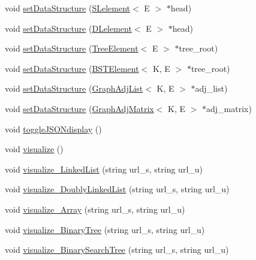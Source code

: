 \begin{DoxyCompactItemize}
\item 
void \hyperlink{classbridges_1_1_bridges_ae5469b9d6cfe0ea2b79c0a082224072d}{set\+Data\+Structure} (\hyperlink{classbridges_1_1_s_lelement}{S\+Lelement}$<$ E $>$ $\ast$head)
\item 
void \hyperlink{classbridges_1_1_bridges_aab453e6347519f7c338b20ca12854146}{set\+Data\+Structure} (\hyperlink{classbridges_1_1_d_lelement}{D\+Lelement}$<$ E $>$ $\ast$head)
\item 
void \hyperlink{classbridges_1_1_bridges_adbc1a98e06e9602996cca175788a2258}{set\+Data\+Structure} (\hyperlink{classbridges_1_1_tree_element}{Tree\+Element}$<$ E $>$ $\ast$tree\+\_\+root)
\item 
void \hyperlink{classbridges_1_1_bridges_aea7aa06709b68551b987ef34e2b403cd}{set\+Data\+Structure} (\hyperlink{classbridges_1_1_b_s_t_element}{B\+S\+T\+Element}$<$ K, E $>$ $\ast$tree\+\_\+root)
\item 
void \hyperlink{classbridges_1_1_bridges_a39f0776e216ffde52583acbfc2dbab0a}{set\+Data\+Structure} (\hyperlink{classbridges_1_1_graph_adj_list}{Graph\+Adj\+List}$<$ K, E $>$ $\ast$adj\+\_\+list)
\item 
void \hyperlink{classbridges_1_1_bridges_a36884a4131a9f8a8905d52d60a6aba39}{set\+Data\+Structure} (\hyperlink{classbridges_1_1_graph_adj_matrix}{Graph\+Adj\+Matrix}$<$ K, E $>$ $\ast$adj\+\_\+matrix)
\item 
void \hyperlink{classbridges_1_1_bridges_ab55b2aa997a62425924084a2fa58a4c3}{toggle\+J\+S\+O\+Ndisplay} ()
\item 
void \hyperlink{classbridges_1_1_bridges_a9dc056c51e3eadff68d637badb0bc3d9}{visualize} ()
\item 
void \hyperlink{classbridges_1_1_bridges_a0b738591d7dec3b2244221e3575d85a4}{visualize\+\_\+\+Linked\+List} (string url\+\_\+s, string url\+\_\+u)
\item 
void \hyperlink{classbridges_1_1_bridges_affa6855df24db3e6a8c27478a7cfd742}{visualize\+\_\+\+Doubly\+Linked\+List} (string url\+\_\+s, string url\+\_\+u)
\item 
void \hyperlink{classbridges_1_1_bridges_ad21f19a4a5de24000109e325048ff4f9}{visualize\+\_\+\+Array} (string url\+\_\+s, string url\+\_\+u)
\item 
void \hyperlink{classbridges_1_1_bridges_aa98a691888869417c6811761f587652d}{visualize\+\_\+\+Binary\+Tree} (string url\+\_\+s, string url\+\_\+u)
\item 
void \hyperlink{classbridges_1_1_bridges_a71d5888a1da6a54991a3ba469d0b6328}{visualize\+\_\+\+Binary\+Search\+Tree} (string url\+\_\+s, string url\+\_\+u)

\end{DoxyCompactItemize}
